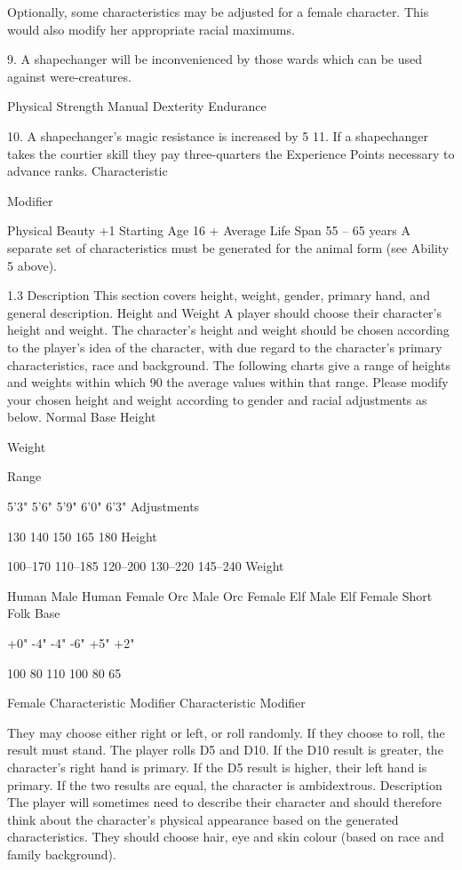 \documentclass[a4paper]{article}
\begin{document}
\begin{multicols}{3}
Optionally, some characteristics may be adjusted
for a female character. This would also modify her
appropriate racial maximums.

9. A shapechanger will be inconvenienced by those
wards which can be used against were-creatures.

Physical Strength
Manual Dexterity
Endurance

10. A shapechanger’s magic resistance is increased
by 5%
11. If a shapechanger takes the courtier skill they
pay three-quarters the Experience Points necessary
to advance ranks.
Characteristic

Modifier

Physical Beauty
+1
Starting Age
16 +
Average Life Span 55 – 65 years
A separate set of characteristics must be generated
for the animal form (see Ability 5 above).

1.3 Description
This section covers height, weight, gender, primary
hand, and general description.
Height and Weight
A player should choose their character’s height and
weight. The character’s height and weight should
be chosen according to the player’s idea of the
character, with due regard to the character’s primary characteristics, race and background.
The following charts give a range of heights and
weights within which 90%
the average values within that range. Please modify
your chosen height and weight according to gender
and racial adjustments as below.
Normal Base
Height

Weight

Range

5’3"
5’6"
5’9"
6’0"
6’3"
Adjustments

130
140
150
165
180
Height

100–170
110–185
120–200
130–220
145–240
Weight

Human Male
Human Female
Orc Male
Orc Female
Elf Male
Elf Female
Short Folk Base

+0"
-4"
-4"
-6"
+5"
+2"

100%
80%
110%
100%
80%
65%

Female Characteristic Modifier
Characteristic
Modifier

They may choose either right or left, or roll randomly. If they choose to roll, the result must stand.
The player rolls D5 and D10. If the D10 result is
greater, the character’s right hand is primary. If the
D5 result is higher, their left hand is primary. If the
two results are equal, the character is ambidextrous.
Description
The player will sometimes need to describe their
character and should therefore think about the
character’s physical appearance based on the generated characteristics. They should choose hair, eye
and skin colour (based on race and family background).


\end{multicols}
\end{document}
